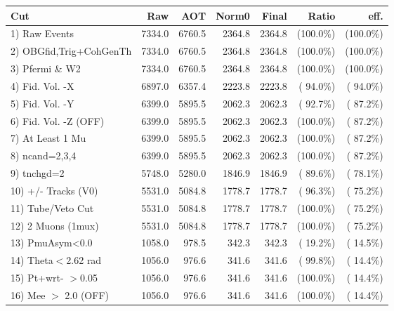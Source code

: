  \begin{table}[h!]\centering
 \begin{tabular}{||l||r|r|r|r|r|r||}
 \hline
 \hline
 Cut & Raw & AOT & Norm0 & Final & Ratio & eff.       \\
 \hline
  1) Raw Events           &       7334.0 &       6760.5 &       2364.8 &       2364.8 & (100.0\%) & (100.0\%) \\
  2) OBGfid,Trig+CohGenTh &       7334.0 &       6760.5 &       2364.8 &       2364.8 & (100.0\%) & (100.0\%) \\
  3) Pfermi \& W2         &       7334.0 &       6760.5 &       2364.8 &       2364.8 & (100.0\%) & (100.0\%) \\
  4) Fid. Vol. -X         &       6897.0 &       6357.4 &       2223.8 &       2223.8 & ( 94.0\%) & ( 94.0\%) \\
  5) Fid. Vol. -Y         &       6399.0 &       5895.5 &       2062.3 &       2062.3 & ( 92.7\%) & ( 87.2\%) \\
  6) Fid. Vol. -Z (OFF)   &       6399.0 &       5895.5 &       2062.3 &       2062.3 & (100.0\%) & ( 87.2\%) \\
  7) At Least 1 Mu        &       6399.0 &       5895.5 &       2062.3 &       2062.3 & (100.0\%) & ( 87.2\%) \\
  8) ncand=2,3,4          &       6399.0 &       5895.5 &       2062.3 &       2062.3 & (100.0\%) & ( 87.2\%) \\
  9) tnchgd=2             &       5748.0 &       5280.0 &       1846.9 &       1846.9 & ( 89.6\%) & ( 78.1\%) \\
 10) +/- Tracks (V0)      &       5531.0 &       5084.8 &       1778.7 &       1778.7 & ( 96.3\%) & ( 75.2\%) \\
 11) Tube/Veto Cut        &       5531.0 &       5084.8 &       1778.7 &       1778.7 & (100.0\%) & ( 75.2\%) \\
 12) 2 Muons (1mux)       &       5531.0 &       5084.8 &       1778.7 &       1778.7 & (100.0\%) & ( 75.2\%) \\
 13) PmuAsym<0.0          &       1058.0 &        978.5 &        342.3 &        342.3 & ( 19.2\%) & ( 14.5\%) \\
 14) Theta$<$2.62 rad     &       1056.0 &        976.6 &        341.6 &        341.6 & ( 99.8\%) & ( 14.4\%) \\
 15) Pt+wrt- $>$0.05      &       1056.0 &        976.6 &        341.6 &        341.6 & (100.0\%) & ( 14.4\%) \\
 16) Mee $>$ 2.0  (OFF)   &       1056.0 &        976.6 &        341.6 &        341.6 & (100.0\%) & ( 14.4\%) \\

\end{tabular}
\end{table}
